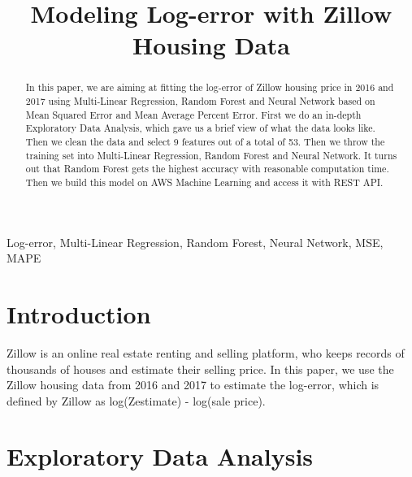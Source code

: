 \documentclass[conference]{IEEEtran}
\begin{document}
\title{Modeling Log-error with Zillow Housing Data}
%
\author{
}
\maketitle
\begin{abstract}
In this paper, we are aiming at fitting the log-error of Zillow housing price in 2016 and 2017 using Multi-Linear Regression, Random Forest and Neural Network based on Mean Squared Error and Mean Average Percent Error.  First we do an in-depth Exploratory Data Analysis, which gave us a brief view of what the data looks like. Then we clean the data and select 9 features out of a total of 53. Then we throw the training set into Multi-Linear Regression, Random Forest and Neural Network. It turns out that Random Forest gets the highest accuracy with reasonable computation time. Then we build this model on AWS Machine Learning and access it with REST API.
\end{abstract}
\begin{keywords}
Log-error, Multi-Linear Regression, Random Forest, Neural Network, MSE, MAPE
\end{keywords}
\IEEEpeerreviewmaketitle
%
\section{Introduction}\label{i}
\indent Zillow is an online real estate renting and selling platform, who keeps records of thousands of houses and estimate their selling price. In this paper, we use the Zillow housing data from 2016 and 2017 to estimate the log-error, which is defined by Zillow as log(Zestimate) - log(sale price). \\
%
\section{Exploratory Data Analysis}\label{ii}
\indent 
\\
%

%
\end{document}
